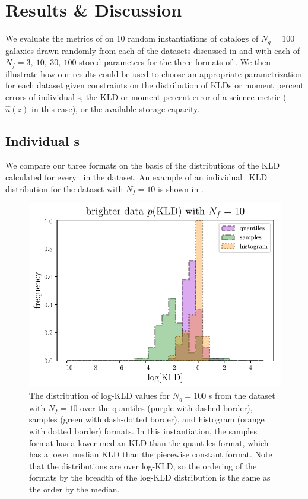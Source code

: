 \section{Results \& Discussion}

We evaluate the metrics of  on 10 random instantiations 
of catalogs of $N_{g}=100$ galaxies drawn randomly from each of the datasets 
discussed in  and with each of $N_{f}=3,\ 10,\ 30,\ 100$ 
stored parameters for the three formats of .
We then illustrate how our results could be used to choose an appropriate 
parametrization for each dataset given constraints on the distribution of KLDs 
or moment percent errors of individual \pz s, the KLD or moment percent error 
of a science metric ($\hat{n}(z)$ in this case), or the available storage 
capacity.


\subsection{Individual \pz s}

We compare our three formats on the basis of the distributions of the KLD 
calculated for every \pz\ in the dataset.
An example of an individual \pz\ KLD distribution for the \mgdata dataset with 
$N_{f}=10$ is shown in .
\begin{figure}
	\begin{center}
		\includegraphics[width=0.49\columnwidth]{figures/qp/individual_kld.pdf}
		\caption{The distribution of log-KLD values for $N_{g}=100$ \pz s from the 
			\mgdata dataset with $N_{f}=10$ over the quantiles (purple with dashed border), 
			samples (green with dash-dotted border), and histogram (orange with dotted 
			border) formats.
			In this instantiation, the samples format has a lower median KLD than the 
			quantiles format, which has a lower median KLD than the piecewise constant 
			format.
			Note that the distributions are over log-KLD, so the ordering of the 
			formats by the breadth of the log-KLD distribution is the same as the order by 
			the median.
			}
	\end{center}
\end{figure}

